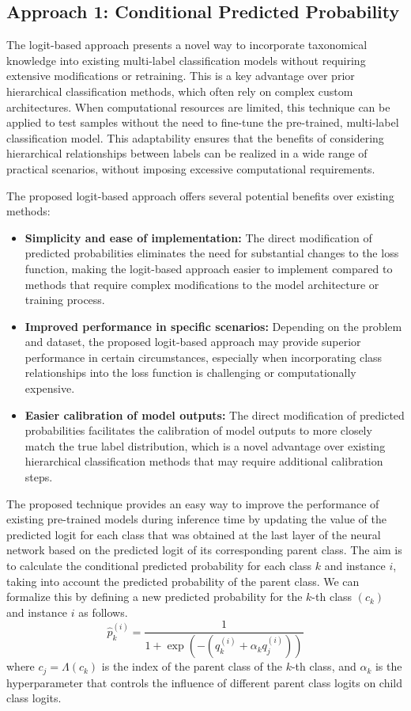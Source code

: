 \documentclass[review,1p,times,numbers]{elsarticle}
\begin{document}
\subsection{Approach 1: Conditional Predicted Probability}\label{subsec:taxonomy.method.approach1}
The logit-based approach presents a novel way to incorporate taxonomical knowledge into existing multi-label classification models without requiring extensive modifications or retraining. This is a key advantage over prior hierarchical classification methods, which often rely on complex custom architectures. When computational resources are limited, this technique can be applied to test samples without the need to fine-tune the pre-trained, multi-label classification model. This adaptability ensures that the benefits of considering hierarchical relationships between labels can be realized in a wide range of practical scenarios, without imposing excessive computational requirements.

The proposed logit-based approach offers several potential benefits over existing methods:
\begin{itemize}
\item  \textbf{Simplicity and ease of implementation:} The direct modification of predicted probabilities eliminates the need for substantial changes to the loss function, making the logit-based approach easier to implement compared to methods that require complex modifications to the model architecture or training process.
\item  \textbf{Improved performance in specific scenarios:} Depending on the problem and dataset, the proposed logit-based approach may provide superior performance in certain circumstances, especially when incorporating class relationships into the loss function is challenging or computationally expensive.
\item  \textbf{Easier calibration of model outputs:} The direct modification of predicted probabilities facilitates the calibration of model outputs to more closely match the true label distribution, which is a novel advantage over existing hierarchical classification methods that may require additional calibration steps.
\end{itemize}
The proposed technique provides an easy way to improve the performance of existing pre-trained models during inference time by updating the value of the predicted logit for each class that was obtained at the last layer of the neural network based on the predicted logit of its corresponding parent class. The aim is to calculate the conditional predicted probability for each class $k $ and instance $i $, taking into account the predicted probability of the parent class. We can formalize this by defining a new predicted probability for the $k$-th class $(c_k) $ and instance $i $ as follows.
\begin{equation}
    \widehat{p}_k^{(i)} = \frac{1}{ 1 + \exp \left(-\left(q_k^{(i)} + \alpha_k q_j^{(i)} \right)\right) }
    \label{eq:taxonomy.eq.1.pred.approach1}
\end{equation}
where $c_j = \Lambda (c_k)$ is the index of the parent class of the $k$-th class, and $\alpha_k $ is the hyperparameter that controls the influence of different parent class logits on child class logits.
\end{document}
